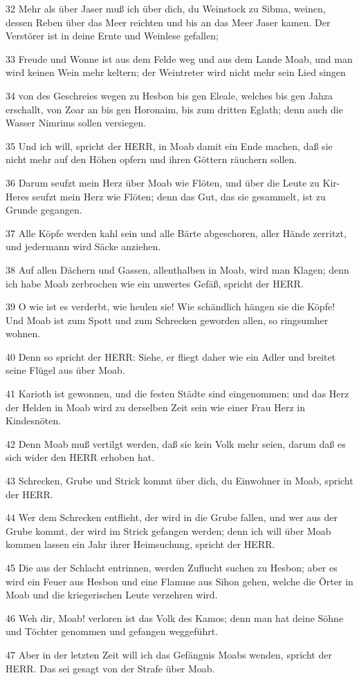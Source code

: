 \par 32 Mehr als über Jaser muß ich über dich, du Weinstock zu Sibma, weinen, dessen Reben über das Meer reichten und bis an das Meer Jaser kamen. Der Verstörer ist in deine Ernte und Weinlese gefallen;
\par 33 Freude und Wonne ist aus dem Felde weg und aus dem Lande Moab, und man wird keinen Wein mehr keltern; der Weintreter wird nicht mehr sein Lied singen
\par 34 von des Geschreies wegen zu Hesbon bis gen Eleale, welches bis gen Jahza erschallt, von Zoar an bis gen Horonaim, bis zum dritten Eglath; denn auch die Wasser Nimrims sollen versiegen.
\par 35 Und ich will, spricht der HERR, in Moab damit ein Ende machen, daß sie nicht mehr auf den Höhen opfern und ihren Göttern räuchern sollen.
\par 36 Darum seufzt mein Herz über Moab wie Flöten, und über die Leute zu Kir-Heres seufzt mein Herz wie Flöten; denn das Gut, das sie gesammelt, ist zu Grunde gegangen.
\par 37 Alle Köpfe werden kahl sein und alle Bärte abgeschoren, aller Hände zerritzt, und jedermann wird Säcke anziehen.
\par 38 Auf allen Dächern und Gassen, allenthalben in Moab, wird man Klagen; denn ich habe Moab zerbrochen wie ein unwertes Gefäß, spricht der HERR.
\par 39 O wie ist es verderbt, wie heulen sie! Wie schändlich hängen sie die Köpfe! Und Moab ist zum Spott und zum Schrecken geworden allen, so ringsumher wohnen.
\par 40 Denn so spricht der HERR: Siehe, er fliegt daher wie ein Adler und breitet seine Flügel aus über Moab.
\par 41 Karioth ist gewonnen, und die festen Städte sind eingenommen; und das Herz der Helden in Moab wird zu derselben Zeit sein wie einer Frau Herz in Kindesnöten.
\par 42 Denn Moab muß vertilgt werden, daß sie kein Volk mehr seien, darum daß es sich wider den HERR erhoben hat.
\par 43 Schrecken, Grube und Strick kommt über dich, du Einwohner in Moab, spricht der HERR.
\par 44 Wer dem Schrecken entflieht, der wird in die Grube fallen, und wer aus der Grube kommt, der wird im Strick gefangen werden; denn ich will über Moab kommen lassen ein Jahr ihrer Heimsuchung, spricht der HERR.
\par 45 Die aus der Schlacht entrinnen, werden Zuflucht suchen zu Hesbon; aber es wird ein Feuer aus Hesbon und eine Flamme aus Sihon gehen, welche die Örter in Moab und die kriegerischen Leute verzehren wird.
\par 46 Weh dir, Moab! verloren ist das Volk des Kamos; denn man hat deine Söhne und Töchter genommen und gefangen weggeführt.
\par 47 Aber in der letzten Zeit will ich das Gefängnis Moabs wenden, spricht der HERR. Das sei gesagt von der Strafe über Moab.

